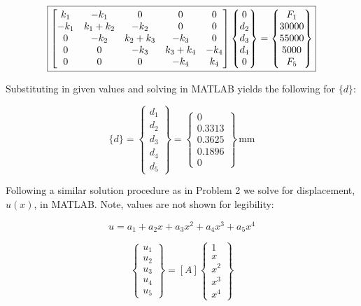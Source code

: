 \documentclass[../main.tex]{subfiles}
\begin{document}
\[
    \boxed{
    \mqty[
        k_1 & -k_1 & 0 & 0 & 0\\
        -k_1 & k_1+k_2 & -k_2 & 0 & 0\\
        0 & -k_2 & k_2+k_3 & -k_3 & 0 \\
        0 & 0 & -k_3 &k_3 + k_4 & -k_4 \\
        0 & 0 & 0 & -k_4 & k_4
    ]
    \begin{Bmatrix}
        0 \\ d_2 \\ d_3 \\d_4 \\ 0
    \end{Bmatrix}
    =
    \begin{Bmatrix}
        F_1 \\ 30000 \\ 55000 \\ 5000 \\ F_5
    \end{Bmatrix}
    }
\]


Substituting in given values and solving in MATLAB yields the following for \(\{d\}\):

\[
    \boxed{\{d\} =     
    \begin{Bmatrix}
        d_1 \\ d_2 \\ d_3 \\d_4 \\d_5
    \end{Bmatrix}
    =
    \begin{Bmatrix}
        0 \\ 0.3313 \\ 0.3625 \\ 0.1896 \\ 0
    \end{Bmatrix} \, \unit{\milli\meter}}
\]


Following a similar solution procedure as in Problem 2 we solve for displacement, \(u(x)\), in MATLAB.
Note, values are not shown for legibility:

\[
    u = a_1 + a_2x + a_3x^2 + a_4 x^3 + a_5 x^4
\]

\[
    \begin{Bmatrix}
        u_1 \\ u_2 \\u_3 \\ u_4 \\u_5
    \end{Bmatrix}
     = [A]
     \begin{Bmatrix}
        1 \\ x \\x^2 \\x^3 \\x^4
    \end{Bmatrix}
\]
\end{document}
